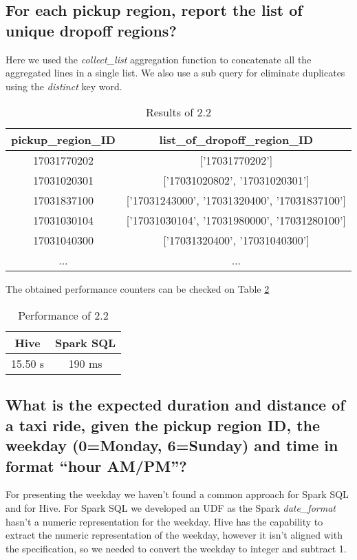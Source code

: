 \documentclass[conference,compsoc]{IEEEtran}
\begin{document}
\subsection{For each pickup region, report the list of unique dropoff regions?}

Here we used the \textit{collect\_list} aggregation function to concatenate all the aggregated lines in a single list. We also use a sub query for eliminate duplicates using the \textit{distinct} key word.

\begin{table}[!t]
\renewcommand{\arraystretch}{1.3}
\caption{Results of 2.2}
\label{output_2_2}
\centering
\begin{tabular}{c||c}
\hline
\bfseries pickup\_region\_ID & \bfseries list\_of\_dropoff\_region\_ID\\
\hline\hline

17031770202 &['17031770202']\\
17031020301 &['17031020802', '17031020301']\\
17031837100 &['17031243000', '17031320400', '17031837100']\\
17031030104 &['17031030104', '17031980000', '17031280100']\\
17031040300 &['17031320400', '17031040300']\\
... &...\\
\hline
\end{tabular}
\end{table}

The obtained performance counters can be checked on Table \ref{perf_2_2}

\begin{table}[!t]
\renewcommand{\arraystretch}{1.3}
\caption{Performance of 2.2}
\label{perf_2_2}
\centering
\begin{tabular}{c|c}
\hline
\bfseries Hive & \bfseries Spark SQL \\
\hline\hline
15.50 s         & 190 ms    \\
\hline
\end{tabular}
\end{table}


\subsection{What is the expected duration and distance of a taxi ride, given the pickup region ID, the weekday (0=Monday, 6=Sunday) and time in format “hour AM/PM”?}

For presenting the weekday we haven't found a common approach for Spark SQL and for Hive. For Spark SQL we developed an UDF as the Spark \textit{date\_format} hasn't a numeric representation for the weekday. Hive has the capability to extract the numeric representation of the weekday, however it isn't aligned with the specification, so we needed to convert the weekday to integer and subtract 1.
\end{document}
